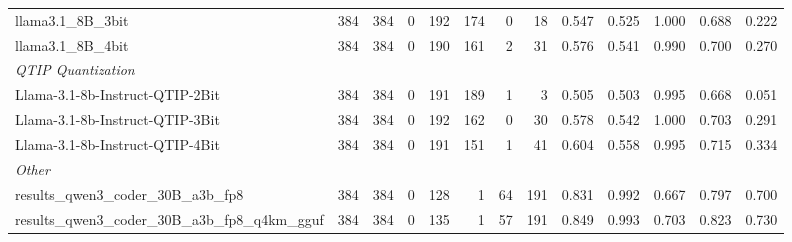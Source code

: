 \begin{table}[htbp]
{\begin{tabular}{lrrrrrrrrrrrr}
    \midrule
    llama3.1\_8B\_3bit & 384 & 384 & 0 & 192 & 174 & 0 & 18 & 0.547 & 0.525 & 1.000 & 0.688 & 0.222 \\
    llama3.1\_8B\_4bit & 384 & 384 & 0 & 190 & 161 & 2 & 31 & 0.576 & 0.541 & 0.990 & 0.700 & 0.270 \\
    \midrule
    \multicolumn{13}{l}{\textit{QTIP Quantization}} \\
    \midrule
    Llama-3.1-8b-Instruct-QTIP-2Bit & 384 & 384 & 0 & 191 & 189 & 1 & 3 & 0.505 & 0.503 & 0.995 & 0.668 & 0.051 \\
    Llama-3.1-8b-Instruct-QTIP-3Bit & 384 & 384 & 0 & 192 & 162 & 0 & 30 & 0.578 & 0.542 & 1.000 & 0.703 & 0.291 \\
    Llama-3.1-8b-Instruct-QTIP-4Bit & 384 & 384 & 0 & 191 & 151 & 1 & 41 & 0.604 & 0.558 & 0.995 & 0.715 & 0.334 \\
    \midrule
    \multicolumn{13}{l}{\textit{Other}} \\
    \midrule
    results\_qwen3\_coder\_30B\_a3b\_fp8 & 384 & 384 & 0 & 128 & 1 & 64 & 191 & 0.831 & 0.992 & 0.667 & 0.797 & 0.700 \\
    results\_qwen3\_coder\_30B\_a3b\_fp8\_q4km\_gguf & 384 & 384 & 0 & 135 & 1 & 57 & 191 & 0.849 & 0.993 & 0.703 & 0.823 & 0.730 \\
    \bottomrule
  \end{tabular}
  }
\end{table}

